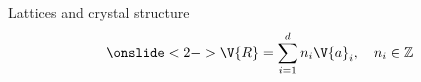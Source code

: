 \documentclass{beamer}
\begin{document}
\begin{frame}{Lattices and crystal structure}
\begin{equation*}
\onslide<2->{\V{R} = \sum_{i = 1}^{d} n_i \V{a}_i, \quad n_i \in \mathbb{Z}}
\end{equation*}
\begin{figure}[H]
	\centering
	\begin{minipage}{.4\textwidth}
		\centering

\end{minipage}
\end{figure}
\end{frame}
\end{document}
